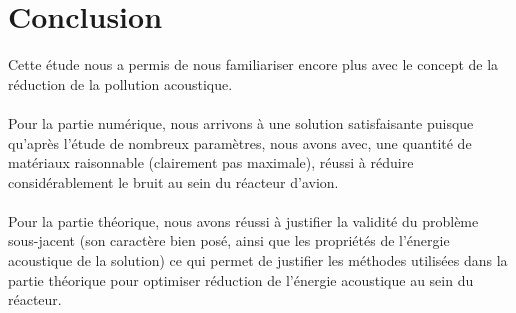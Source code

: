 \section{Conclusion}

Cette étude nous a permis de nous familiariser encore plus avec le concept de la réduction de la pollution acoustique.\\ \\
Pour la partie numérique, nous arrivons à une solution satisfaisante puisque qu'après l'étude de nombreux paramètres, nous avons avec, une quantité de matériaux raisonnable (clairement pas maximale), réussi à réduire considérablement le bruit au sein du réacteur d'avion. \\ \\
Pour la partie théorique, nous avons réussi à justifier la validité du problème sous-jacent (son caractère bien posé, ainsi que les propriétés de l'énergie acoustique de la solution) ce qui permet de justifier les méthodes utilisées dans la partie théorique pour optimiser réduction de l'énergie acoustique au sein du réacteur.
